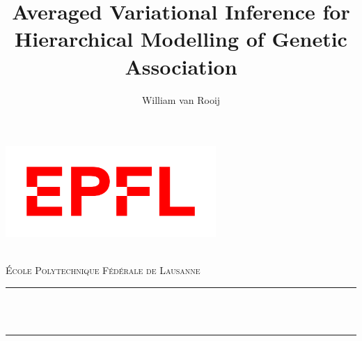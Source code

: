 \documentclass[a4paper, 11pt]{report}
\title{Averaged Variational Inference for Hierarchical Modelling of Genetic Association}
\author{William van Rooij}
\numberwithin{equation}{chapter}
\begin{document}
\SetEndCharOfAlgoLine{}


\begin{titlepage}

\newcommand{\HRule}{\rule{\linewidth}{0.5mm}} %


\includegraphics[width=8cm]{images/EPFL_logo.png}\\[1cm] %
 

\center %

\quad\\[1.5cm]
\textsc{\Large École Polytechnique Fédérale de Lausanne}\\[0.5cm] %

\makeatletter
\HRule \\[0.4cm]
{ \huge \bfseries \@title}\\[0.4cm] %
\HRule \\[1.5cm]
 


\end{titlepage}
\end{document}
